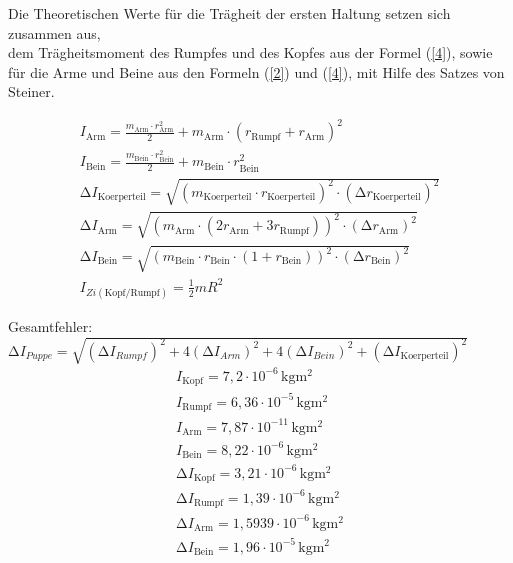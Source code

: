\newpage

\begin{flushleft}
    Die Theoretischen Werte für die Trägheit der ersten Haltung setzen sich zusammen aus, \\
    dem Trägheitsmoment des Rumpfes und des Kopfes aus der Formel (\ref{4}), sowie für die Arme und Beine
    aus den Formeln (\ref{2}) und (\ref{4}), mit Hilfe des Satzes von Steiner.
\end{flushleft}

\begin{align*}
 I_{\text{Arm}} = \frac{m_{\text{Arm}} \cdot r^2_{\text{Arm}}}{2} + m_{\text{Arm}} \cdot (r_{\text{Rumpf}} + r_{\text{Arm}})^2 \\
 I_{\text{Bein}} = \frac{m_{\text{Bein}} \cdot r^2_{\text{Bein}}}{2} + m_{\text{Bein}} \cdot r^2_{\text{Bein}}   \\
 \increment I_{\text{Koerperteil}} = \sqrt{(m_{\text{Koerperteil}} \cdot r_{\text{Koerperteil}})^2 \cdot (\increment r_{\text{Koerperteil}})^2 } \\
 \increment I_{\text{Arm}} = \sqrt{ (m_{\text{Arm}} \cdot(2r_{\text{Arm}} + 3r_{\text{Rumpf}}))^2 \cdot (\increment r_{\text{Arm}})^2 } \\
 \increment I_{\text{Bein}} = \sqrt{ (m_{\text{Bein}} \cdot r_{\text{Bein}} \cdot (1+r_{\text{Bein}}))^2 \cdot (\increment r_{\text{Bein}})^2 }\\
 I_{Zi(\text{Kopf/Rumpf})} = \frac{1}{2}mR^2 
\end{align*}

Gesamtfehler:  $ \increment I_{Puppe} = \sqrt{(\increment I_{Rumpf})^2 + 4(\increment I_{Arm})^2 +4(\increment I_{Bein})^2 + (\increment I_{\text{Koerperteil}})^2} $ \\
    
\begin{align*}
 I_{\text{Kopf}} = 7,2 \cdot 10^{-6}\,\unit{\kilo\gram\meter^2}  \\
 I_{\text{Rumpf}} = 6,36 \cdot 10^{-5}\,\unit{\kilo\gram\meter^2}  \\
 I_{\text{Arm}} = 7,87 \cdot 10^{-11}\,\unit{\kilo\gram\meter^2}   \\
 I_{\text{Bein}} = 8,22 \cdot 10^{-6}\,\unit{\kilo\gram\meter^2}  \\
 \increment I_{\text{Kopf}} = 3,21 \cdot 10^{-6}\,\unit{\kilo\gram\meter^2}  \\
 \increment I_{\text{Rumpf}} = 1,39 \cdot 10^{-6}\,\unit{\kilo\gram\meter^2}  \\
 \increment I_{\text{Arm}} = 1,5939 \cdot 10^{-6}\,\unit{\kilo\gram\meter^2}  \\
 \increment I_{\text{Bein}} = 1,96 \cdot 10^{-5}\,\unit{\kilo\gram\meter^2}  \\
\end{align*}

